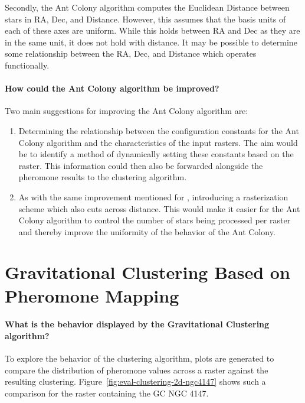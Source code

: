 Secondly, the Ant Colony algorithm computes the Euclidean Distance between stars
in RA, Dec, and Distance. However, this assumes that the basis units of each of
these axes are uniform. While this holds between RA and Dec as they are in the
same unit, it does not hold with distance. It may be possible to determine some
relationship between the RA, Dec, and Distance which operates functionally.

\paragraph{How could the Ant Colony algorithm be improved?}\paragraphnewline{}
\noindent
Two main suggestions for improving the Ant Colony algorithm are:
\begin{enumerate}
    \item Determining the relationship between the configuration constants for the
          Ant Colony algorithm and the characteristics of the input rasters. The aim
          would be to identify a method of dynamically setting these constants based on
          the raster. This information could then also be forwarded alongside the
          pheromone results to the clustering algorithm.
    \item As with the same improvement mentioned for \blobdog{}, introducing a
          rasterization scheme which also cuts across distance. This would make it easier
          for the Ant Colony algorithm to control the number of stars being processed per
          raster and thereby improve the uniformity of the behavior of the Ant Colony.
\end{enumerate}

\section{\label{sec:eval-clustering}Gravitational Clustering Based on Pheromone Mapping}

\paragraph{What is the behavior displayed by the Gravitational Clustering algorithm? }\paragraphnewline{}
To explore the behavior of the clustering algorithm, plots are generated to
compare the distribution of pheromone values across a raster against the
resulting clustering. Figure~\ref{fig:eval-clustering-2d-ngc4147} shows such a
comparison for the raster containing the GC NGC 4147.

